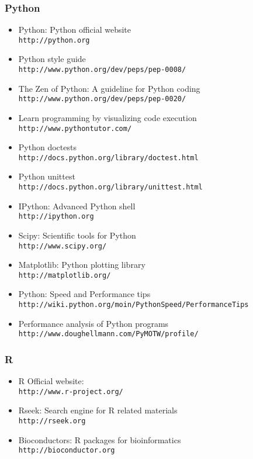 \documentclass[ChapterTOCs,krantz2]{krantz} %
\begin{document}
\subsubsection{Python}
\begin{itemize}
\item Python: Python official website\\ \texttt{http://python.org}
\item Python style guide\\ \texttt{http://www.python.org/dev/peps/pep-0008/}
\item The Zen of Python: A guideline for Python coding \\\texttt{http://www.python.org/dev/peps/pep-0020/}
\item Learn programming by visualizing code execution \\\texttt{http://www.pythontutor.com/}
\item Python doctests \\\texttt{http://docs.python.org/library/doctest.html}
\item Python unittest \\\texttt{http://docs.python.org/library/unittest.html}
\item IPython: Advanced Python shell \\\texttt{http://ipython.org}
\item Scipy: Scientific tools for Python \\\texttt{http://www.scipy.org/}
\item Matplotlib: Python plotting library \\\texttt{http://matplotlib.org/}
\item Python: Speed and Performance tips \\\texttt{http://wiki.python.org/moin/PythonSpeed/PerformanceTips}
\item Performance analysis of Python programs \\\texttt{http://www.doughellmann.com/PyMOTW/profile/}
\end{itemize}

\subsubsection{R}
\begin{itemize}
\item R Official website: \\\texttt{http://www.r-project.org/}
\item Rseek: Search engine for R related materials \\\texttt{http://rseek.org}
\item Bioconductors: R packages for bioinformatics \\\texttt{http://bioconductor.org}
\end{itemize}
\end{document}
